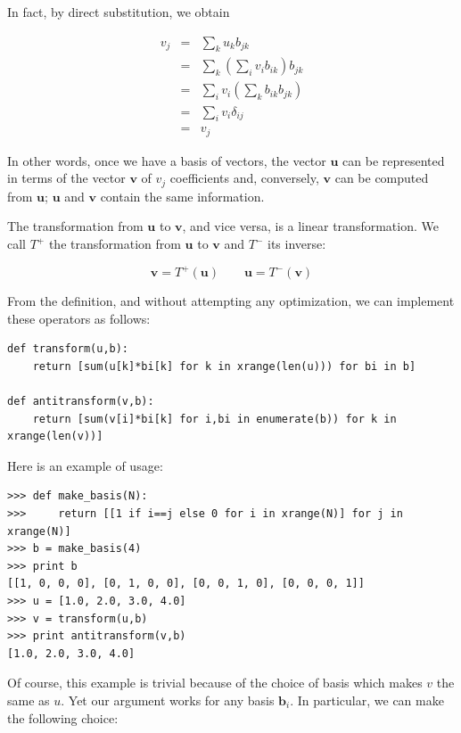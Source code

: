 \documentclass[justified,sixbynine]{tufte-book}
\theoremstyle{plain}%
\theoremstyle{definition}
\theoremstyle{remark}
\begin{document}
\begin{fullwidth}
In fact, by direct substitution, we obtain

\begin{eqnarray}
  v_j &=& \sum_k u_k b_{jk} \\
      &=& \sum_k (\sum_i v_i b_{ik}) b_{jk} \\
      &=& \sum_i v_i (\sum_k b_{ik} b_{jk}) \\
      &=& \sum_i v_i \delta_{ij} \\
      &=& v_j
\end{eqnarray}

In other words, once we have a basis of vectors, the vector $\mathbf{u}$ can be represented in terms of the vector $\mathbf{v}$ of $v_j$ coefficients and, conversely, $\mathbf{v}$ can be computed from $\mathbf{u}$; $\mathbf{u}$ and $\mathbf{v}$ contain the same information.

The transformation from $\mathbf{u}$ to $\mathbf{v}$, and vice versa, is a linear transformation. We call $T^+$ the transformation from $\mathbf{u}$ to $\mathbf{v}$  and $T^-$ its inverse:

\begin{equation}
\mathbf{v} = T^+(\mathbf{u}) \qquad
\mathbf{u} = T^-(\mathbf{v})
\end{equation}

From the definition, and without attempting any optimization, we can implement these operators as follows:

\begin{lstlisting}
def transform(u,b):
    return [sum(u[k]*bi[k] for k in xrange(len(u))) for bi in b]

def antitransform(v,b):
    return [sum(v[i]*bi[k] for i,bi in enumerate(b)) for k in xrange(len(v))]
\end{lstlisting}

Here is an example of usage:

\begin{lstlisting}
>>> def make_basis(N):
>>>     return [[1 if i==j else 0 for i in xrange(N)] for j in xrange(N)]
>>> b = make_basis(4)
>>> print b
[[1, 0, 0, 0], [0, 1, 0, 0], [0, 0, 1, 0], [0, 0, 0, 1]]
>>> u = [1.0, 2.0, 3.0, 4.0]
>>> v = transform(u,b)
>>> print antitransform(v,b)
[1.0, 2.0, 3.0, 4.0]
\end{lstlisting}

Of course, this example is trivial because of the choice of basis which makes $v$ the same as $u$. Yet our argument works for any basis $\mathbf{b}_i$. In particular, we can make the following choice:



\end{fullwidth}
\end{document}
